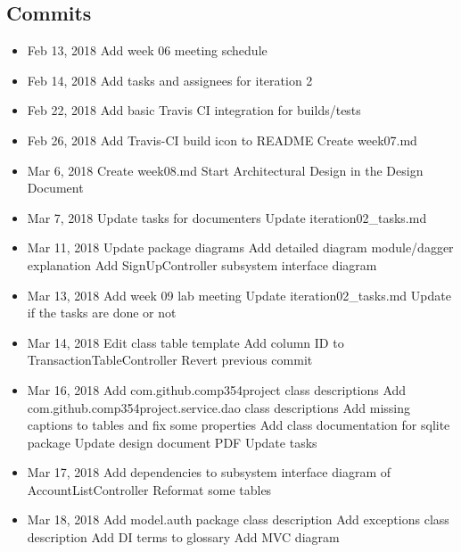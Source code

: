 \documentclass[12pt]{article}
\begin{document}
\subsection{Commits}
\begin{itemize}
    \item Feb 13, 2018
        \subitem [DOC] Add week 06 meeting schedule
    \item Feb 14, 2018
        \subitem [DOC] Add tasks and assignees for iteration 2
    \item Feb 22, 2018
        \subitem [BUILD] Add basic Travis CI integration for builds/tests
    \item Feb 26, 2018
        \subitem [BUILD] Add Travis-CI build icon to README
        \subitem Create week07.md
    \item Mar 6, 2018
        \subitem Create week08.md
        \subitem [DOC] Start Architectural Design in the Design Document
    \item Mar 7, 2018
        \subitem [DOC] Update tasks for documenters
        \subitem Update iteration02\_tasks.md
    \item Mar 11, 2018
        \subitem [DOC] Update package diagrams
        \subitem [DOC] Add detailed diagram module/dagger explanation
        \subitem [DOC] Add SignUpController subsystem interface diagram
    \item Mar 13, 2018
        \subitem Add week 09 lab meeting
        \subitem Update iteration02\_tasks.md
        \subitem Update if the tasks are done or not
    \item Mar 14, 2018
        \subitem [DOC] Edit class table template
        \subitem [FEAT] Add column ID to TransactionTableController
        \subitem [REVERT] Revert previous commit
    \item Mar 16, 2018
        \subitem [DOC] Add com.github.comp354project class descriptions
        \subitem [DOC] Add com.github.comp354project.service.dao class descriptions
        \subitem [DOC] Add missing captions to tables and fix some properties
        \subitem [DOC] Add class documentation for sqlite package
        \subitem [DOC] Update design document PDF
        \subitem [DOC] Update tasks
    \item Mar 17, 2018
        \subitem [DOC] Add dependencies to subsystem interface diagram of AccountListController
        \subitem [DOC] Reformat some tables
    \item Mar 18, 2018
        \subitem [DOC] Add model.auth package class description
        \subitem [DOC] Add exceptions class description
        \subitem [DOC] Add DI terms to glossary
        \subitem [DOC] Add MVC diagram
\end{itemize}
\end{document}
